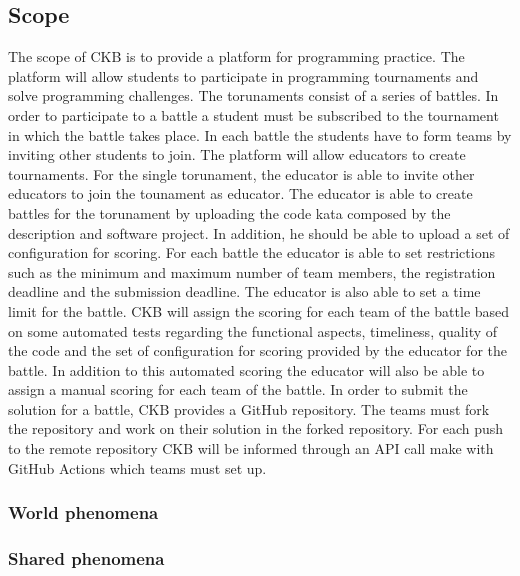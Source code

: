 \subsection{Scope}
The scope of CKB is to provide a platform for programming practice. The platform will allow students to participate in programming tournaments and solve programming challenges. The torunaments consist of a series of battles. In order to participate to a battle a student must be subscribed to the tournament in which the battle takes place. In each battle the students have to form teams by inviting other students to join.
The platform will allow educators to create tournaments. For the single torunament, the educator is able to invite other educators to join the tounament as educator.
The educator is able to create battles for the torunament by uploading the code kata composed by the description and software project. In addition, he should be able to upload a set of configuration for scoring. For each battle the educator is able to set restrictions such as the minimum and maximum number of team members, the registration deadline and the submission deadline. The educator is also able to set a time limit for the battle.
CKB will assign the scoring for each team of the battle based on some automated tests regarding the functional aspects, timeliness, quality of the code and the set of configuration for scoring provided by the educator for the battle. In addition to this automated scoring the educator will also be able to assign a manual scoring for each team of the battle.
In order to submit the solution for a battle, CKB provides a GitHub repository. The teams must fork the repository and work on their solution in the forked repository. For each push to the remote repository CKB will be informed through an API call make with GitHub Actions which teams must set up.

\subsubsection{World phenomena}
\subsubsection{Shared phenomena}